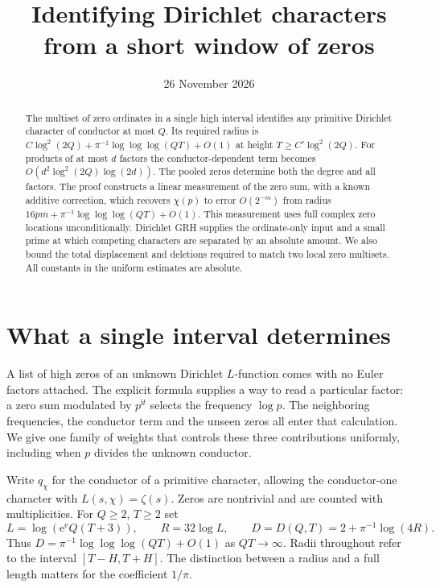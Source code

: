 \documentclass[11pt]{article}
\title{\textcolor{ink}{Identifying Dirichlet characters from a short window of zeros}}
\author{}
\date{26 November 2026}
\newcommand{\ee}{\mathrm e}
\newcommand{\ii}{\mathrm i}
\begin{document}
\maketitle
\vspace{-1.6em}
\begin{abstract}
The multiset of zero ordinates in a single high interval identifies any primitive Dirichlet character of conductor at most $Q$. Its required radius is $C\log^2(2Q)+\pi^{-1}\log\log\log(QT)+O(1)$ at height $T\ge C'\log^2(2Q)$. For products of at most $d$ factors the conductor-dependent term becomes $O(d^2\log^2(2Q)\log(2d))$. The pooled zeros determine both the degree and all factors. The proof constructs a linear measurement of the zero sum, with a known additive correction, which recovers $\chi(p)$ to error $O(2^{-m})$ from radius $16pm+\pi^{-1}\log\log\log(QT)+O(1)$. This measurement uses full complex zero locations unconditionally. Dirichlet GRH supplies the ordinate-only input and a small prime at which competing characters are separated by an absolute amount. We also bound the total displacement and deletions required to match two local zero multisets. All constants in the uniform estimates are absolute.
\end{abstract}

\section{What a single interval determines}
A list of high zeros of an unknown Dirichlet $L$-function comes with no Euler factors attached. The explicit formula supplies a way to read a particular factor: a zero sum modulated by $p^{\ii t}$ selects the frequency $\log p$. The neighboring frequencies, the conductor term and the unseen zeros all enter that calculation. We give one family of weights that controls these three contributions uniformly, including when $p$ divides the unknown conductor.

Write $q_\chi$ for the conductor of a primitive character, allowing the conductor-one character with $L(s,\chi)=\zeta(s)$. Zeros are nontrivial and are counted with multiplicities. For $Q\ge2$, $T\ge2$ set
\begin{equation}\label{radius}
 L=\log(\ee^{\ee}Q(T+3)),\qquad R=32\log L,\qquad
 D=D(Q,T)=2+\pi^{-1}\log(4R).
\end{equation}
Thus $D=\pi^{-1}\log\log\log(QT)+O(1)$ as $QT\to\infty$. Radii throughout refer to the interval $[T-H,T+H]$. The distinction between a radius and a full length matters for the coefficient $1/\pi$.
\end{document}
